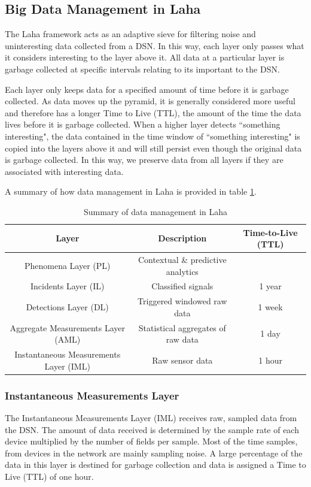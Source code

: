 \subsection{Big Data Management in Laha} \label{big-data-management}
The Laha framework acts as an adaptive sieve for filtering noise and uninteresting data collected from a DSN. In this way, each layer only passes what it considers interesting to the layer above it. All data at a particular layer is garbage collected at specific intervals relating to its important to the DSN.

Each layer only keeps data for a specified amount of time before it is garbage collected. As data moves up the pyramid, it is generally considered more useful and therefore has a longer Time to Live (TTL), the amount of the time the data lives before it is garbage collected.  When a higher layer detects ``something interesting", the data contained in the time window of ``something interesting" is copied into the layers above it and will still persist even though the original data is garbage collected. In this way, we preserve data from all layers if they are associated with interesting data. 

A summary of how data management in Laha is provided in table \ref{data-managament-table}.

\begin{table}
	\caption{Summary of data management in Laha}
	\begin{tabular}{|c|c|c|}
		\hline 
		Layer & Description & Time-to-Live (TTL) \\ 
		\hline 
		Phenomena Layer (PL) & Contextual \& predictive analytics &  \\ 
		\hline 
		Incidents Layer (IL) & Classified signals &  1 year \\ 
		\hline 
		Detections Layer (DL) & Triggered windowed raw data & 1 week  \\ 
		\hline 
		Aggregate Measurements Layer (AML) & Statistical aggregates of raw data  & 1 day  \\ 
		\hline 
		Instantaneous Measurements Layer (IML) & Raw sensor data  & 1 hour \\ 
		\hline 
	\end{tabular} 
    \label{data-managament-table}
\end{table}

\subsubsection{Instantaneous Measurements Layer}
The Instantaneous Measurements Layer (IML) receives raw, sampled data from the DSN. The amount of data received is determined by the sample rate of each device multiplied by the number of fields per sample. Most of the time samples, from devices in the network are mainly sampling noise. A large percentage of the data in this layer is destined for garbage collection and data is assigned a Time to Live (TTL) of one hour. 


